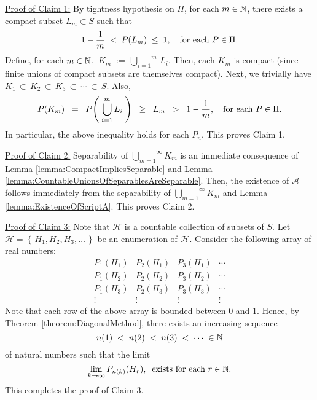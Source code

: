 \vskip 0.5cm
\noindent
\underline{Proof of Claim 1:}\quad
By tightness hypothesis on $\Pi$,
for each $m \in \mathbb{N}$,
there exists a compact subset $L_{m} \subset S$ such that
\begin{equation*}
1 - \dfrac{1}{m} \; < \; P(L_{m}) \; \leq \; 1,
\quad
\textnormal{for each $P \in \Pi$}.
\end{equation*}
Define, for each $m \in \mathbb{N}$,
\,$K_{m} \; := \, \overset{m}{\underset{i=1}{\bigcup}}\,L_{i}$.
Then, each $K_{m}$ is compact (since finite unions of compact subsets are themselves compact).
Next, we trivially have\;
$K_{1} \,\subset\, K_{2} \,\subset\, K_{3} \,\subset\, \cdots \,\subset\, S$.
Also,
\begin{equation*}
P(K_{m})
\;\;=\;\; P\!\left(\;\bigcup_{i=1}^{m}L_{i}\;\right)
\;\;\geq\;\; L_{m}
\;\; > \;\; 1 - \dfrac{1}{m},
\quad
\textnormal{for each $P \in \Pi$}.
\end{equation*}
In particular, the above inequality holds for each $P_{n}$. This proves Claim 1.


\vskip 0.5cm
\noindent
\underline{Proof of Claim 2:}\quad
Separability of $\overset{\infty}{\underset{m=1}{\bigcup}}K_{m}$ is an immediate consequence of
Lemma \ref{lemma:CompactImpliesSeparable} and
Lemma \ref{lemma:CountableUnionsOfSeparablesAreSeparable}.
Then, the existence of $\mathcal{A}$ follows immediately
from the separability of $\overset{\infty}{\underset{m=1}{\bigcup}}K_{m}$
and Lemma \ref{lemma:ExistenceOfScriptA}.
This proves Claim 2.

\vskip 0.5cm
\noindent
\underline{Proof of Claim 3:}\quad
Note that $\mathcal{H}$ is a countable collection of subsets of $S$.
Let $\mathcal{H} = \left\{\,H_{1}, H_{2}, H_{3}, \ldots \,\right\}$ be an enumeration of $\mathcal{H}$.
Consider the following array of real numbers:
\begin{equation*}
\begin{array}{cccc}
P_{1}(H_{1}) & P_{2}(H_{1}) & P_{3}(H_{1}) & \cdots \\
P_{1}(H_{2}) & P_{2}(H_{2}) & P_{3}(H_{2}) & \cdots \\
P_{1}(H_{3}) & P_{2}(H_{3}) & P_{3}(H_{3}) & \cdots \\
\vdots & \vdots & \vdots & \vdots  
\end{array}
\end{equation*}
Note that each row of the above array is bounded between $0$ and $1$.
Hence, by Theorem \ref{theorem:DiagonalMethod}, there exists an increasing sequence
\begin{equation*}
n(1) \;<\;
n(2) \;<\;
n(3) \;<\;
\cdots\; \in \mathbb{N}
\end{equation*}
of natural numbers such that the limit
\begin{equation*}
\lim_{k\rightarrow\infty} P_{n(k)}(H_{r}),
\;\;\textnormal{exists for each $r \in \mathbb{N}$}.
\end{equation*}
This completes the proof of Claim 3.

